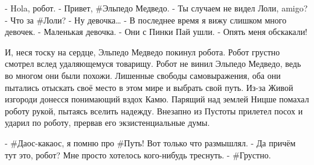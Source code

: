 - Hola, робот.
- Привет, #Эльпедо Медведо.
- Ты случаем не видел Лоли, amigo?
- Что за #Лоли?
- Ну девочка…
- В последнее время я вижу слишком много девочек.
- Маленькая девочка.
- Они с Пинки Пай ушли.
- Опять меня обскакали!

И, неся тоску на сердце, Эльпедо Медведо покинул робота. Робот грустно смотрел вслед удаляющемуся товарищу. Робот не винил Эльпедо Медведо, ведь во многом они были похожи. Лишенные свободы самовыражения, оба они пытались отыскать своё место в этом мире и выбрать свой путь. Из-за Живой изгороди донесся понимающий вздох Камю. Парящий над землей Ницше помахал роботу рукой, пытаясь вселить надежду. Внезапно из Пустоты прилетел посох и ударил по роботу, прервав его экзистенциальные думы.

- #Даос-какаос, я помню про #Путь! Вот только что размышлял.
- Да причём тут это, робот? Мне просто хотелось кого-нибудь треснуть.
- #Грустно.